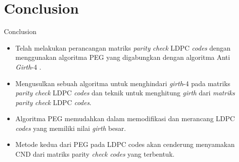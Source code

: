 \documentclass[11pt, aspectratio=169]{beamer}
\begin{document}
\section{Conclusion}
\begin{frame}{Conclusion}
\begin{itemize}
\justifying
\item Telah melakukan perancangan matriks \textit{parity} \textit{check} LDPC \textit{codes}  dengan menggunakan algoritma PEG yang digabungkan dengan algoritma Anti \textit{Girth}-4 . 
\item Mengusulkan sebuah algoritma untuk menghindari \textit{girth}-4 pada matriks \textit{parity} \textit{check} LDPC \textit{codes} dan teknik untuk menghitung \textit{girth} dari \textit{matriks parity check} LDPC \textit{codes}.
\item Algoritma PEG  memudahkan dalam memodifikasi dan merancang LDPC \textit{codes} yang memiliki nilai \textit{girth} besar.
\item Metode kedua dari PEG pada LDPC codes akan cenderung menyamakan CND dari matriks parity \textit{check codes} yang terbentuk. 
\end{itemize}
\end{frame}




\end{document}
